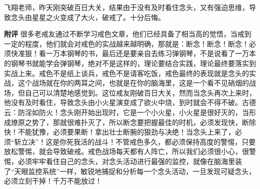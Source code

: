 \begin{case}
    飞翔老师，昨天刚突破百日大关，结果由于没有及时看住念头，又有强迫思维，导致念头由星星之火变成了大火，破戒了。十分后悔。

    \textbf{附评} 很多老戒友通过不断学习戒色文章，他们已经具备了相当高的觉悟，当戒到一定的程度，他们就会对戒色的实战越来越明确，那就是：断念！断念！断念！必须快准狠！看一万本钢琴的书，最后还是要亲自去练习弹钢琴，不是说看了一万本的钢琴书就能学会弹钢琴，绝对不是这样的，理论要结合实践，理论最终要落实到实战上来。戒色不是纸上谈兵，戒色不是请客吃饭，戒色最终的表现就是念头的实战，这个战场就在你的两耳之间，也就是在你的脑海里，这是一个看不见硝烟的战场，但自己可以清楚地感觉到。这位戒友刚破百日大关，然而当念头再次上来时，他没有及时看住，导致念头由小火星演变成了欲火中烧，到时就会不得不破。古德云：防淫如防火！念头刚开始出现时，它是一个小火星，小火星是很好灭的，当形成燎原之势了，那就很难扑灭了，所以断念要把握最佳的时机，必须发现快，断除快！不能犹豫，必须要果断！拿出壮士断腕的狠劲与决绝！当念头上来了，必须“斩立决”！这是你死我活的战斗！不管戒色多久，都必须保持高度的警惕，只要放松警惕，就会导致破戒。戒色战场每天都有人阵亡，所以我们必须很小心，很警惕，必须牢牢看住自己的念头，对念头活动进行最强的监控，就像在脑海里装了“天眼监控系统”一样，敏锐地捕捉和分析每一个念头活动，一旦发现可疑念头，必须立刻干掉！千万不能放过！
\end{case}


